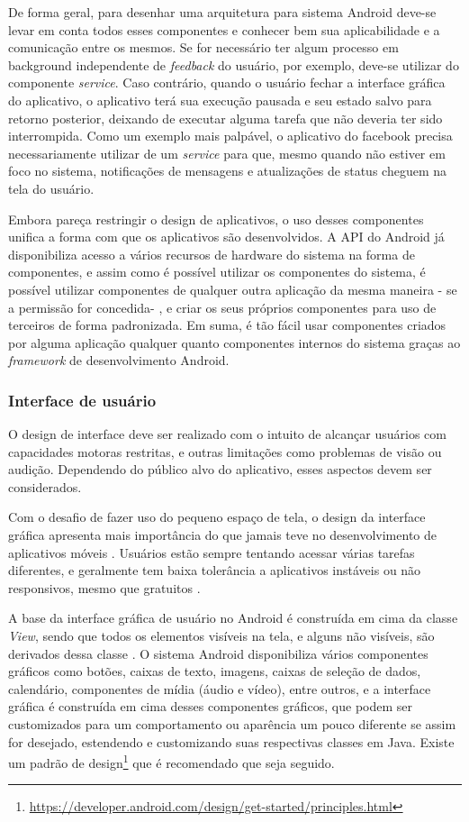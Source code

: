 De forma geral, para desenhar uma arquitetura para sistema Android deve-se levar em conta todos esses componentes e conhecer bem sua aplicabilidade e a comunicação entre os mesmos. Se for necessário ter algum processo em background independente de \textit{feedback} do usuário, por exemplo, deve-se utilizar do componente \textit{service}. Caso contrário, quando o usuário fechar a interface gráfica do aplicativo, o aplicativo terá sua execução pausada e seu estado salvo para retorno posterior, deixando de executar alguma tarefa que não deveria ter sido interrompida. Como um exemplo mais palpável, o aplicativo do facebook precisa necessariamente utilizar de um \textit{service} para que, mesmo quando não estiver em foco no sistema, notificações de mensagens e atualizações de status cheguem na tela do usuário.

Embora pareça restringir o design de aplicativos, o uso desses componentes unifica a forma com que os aplicativos são desenvolvidos. A API do Android já disponibiliza acesso a vários recursos de hardware do sistema na forma de componentes, e assim como é possível utilizar os componentes do sistema, é possível utilizar componentes de qualquer outra aplicação da mesma maneira - se a permissão for concedida- , e criar os seus próprios componentes para uso de terceiros de forma padronizada. Em suma, é tão fácil usar componentes criados por alguma aplicação qualquer quanto componentes internos do sistema graças ao \textit{framework} de desenvolvimento Android.

\subsubsection{Interface de usuário}

O design de interface deve ser realizado com o intuito de alcançar usuários com capacidades motoras restritas, e outras limitações como problemas de visão ou audição. Dependendo do público alvo do aplicativo, esses aspectos devem ser considerados.

Com o desafio de fazer uso do pequeno espaço de tela, o design da interface gráfica apresenta mais importância do que jamais teve no desenvolvimento de aplicativos móveis \cite{eswissues}. Usuários estão sempre tentando acessar várias tarefas diferentes, e geralmente tem baixa tolerância a aplicativos instáveis ou não responsivos, mesmo que gratuitos \cite{eswmobile}. 

A base da interface gráfica de usuário no Android é construída em cima da classe \textit{View}, sendo que todos os elementos visíveis na tela, e alguns não visíveis, são derivados dessa classe \cite{androidarch2010}. O sistema Android disponibiliza vários componentes gráficos como botões, caixas de texto, imagens, caixas de seleção de dados, calendário, componentes de mídia (áudio e vídeo), entre outros, e a interface gráfica é construída em cima desses componentes gráficos, que podem ser customizados para um comportamento ou aparência um pouco diferente se assim for desejado, estendendo e customizando suas respectivas classes em Java. Existe um padrão de design\footnote{\url{https://developer.android.com/design/get-started/principles.html}} que é recomendado que seja seguido.

